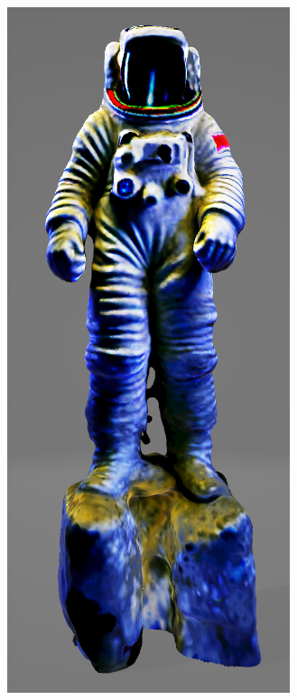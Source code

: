 \begin{figure}[ht]
    \centering
    \small
    \begin{subfigure}[b]{0.187\textwidth}
        \centering
        \includegraphics[width=\textwidth]{figures/appendix/magic3D_astronaut.PNG}

\end{subfigure}
\end{figure}
